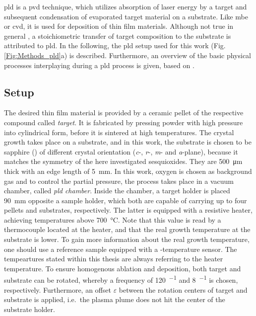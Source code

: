\acrfull{pld} is a \acrfull{pvd} technique, which utilizes absorption of laser energy by a target and subsequent condensation of evaporated target material on a substrate.
Like \gls{mbe} or \gls{cvd}, it is used for deposition of thin film materials.
Although not true in general \cite{lorenz2019}, a stoichiometric transfer of target composition to the substrate is attributed to \gls{pld}.
In the following, the \gls{pld} setup used for this work (Fig.\,\ref{Fig:Methods_pld}a) is described.
Furthermore, an overview of the basic physical processes interplaying during a \gls{pld} process is given, based on \textcite{lorenz2019}.

\subsection{Setup}\label{Sec:Methods_pld}
The desired thin film material is provided by a ceramic pellet of the respective compound called \emph{target}.
It is fabricated by pressing powder with high pressure into cylindrical form, before it is sintered at high temperatures.
The crystal growth takes place on a substrate, and in this work, the substrate is chosen to be sapphire () of different crystal orientation (\textit{c}-, \textit{r}-, \textit{m}- and \textit{a}-plane), because it matches the symmetry of the here investigated sesquioxides.
They are \qty{500}{\um} thick with an edge length of \qty{5}{\mm}.
%
In this work, oxygen is chosen as background gas and to control the partial pressure, the process takes place in a vacuum chamber, called \emph{\gls{pld} chamber}.
Inside the chamber, a target holder is placed \qty{90}{\mm} opposite a sample holder, which both are capable of carrying up to four pellets and substrates, respectively.
The latter is equipped with a resistive heater, achieving temperatures above \qty{700}{\celsius}.
Note that this value is read by a thermocouple located at the heater, and that the real growth temperature at the substrate is lower.
To gain more information about the real growth temperature, one should use a reference sample equipped with a -temperature sensor.
The tempeartures stated within this thesis are always referring to the heater temperature.
To ensure homogenous ablation and deposition, both target and substrate can be rotated, whereby a frequency of \qty{120}{\min^{-1}} and \qty{8}{\min^{-1}} is chosen, respectively.
Furthermore, an offset $\varepsilon$ between the rotation centers of target and substrate is applied, i.e.\ the plasma plume does not hit the center of the substrate holder.
